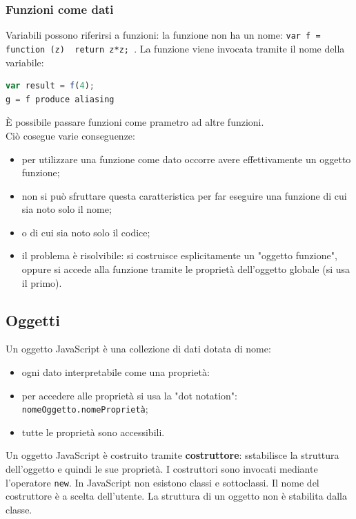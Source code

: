 \documentclass{article}
\begin{document}
\subsubsection{Funzioni come dati}
Variabili possono riferirsi a funzioni: la funzione non ha un nome: \texttt{var f = function (z) { return z*z; }}. La funzione viene invocata tramite il nome della variabile:
\begin{lstlisting}[language=JavaScript]
var result = f(4);
g = f produce aliasing
\end{lstlisting}
È possibile passare funzioni come prametro ad altre funzioni.
\\ Ciò cosegue varie conseguenze:
\begin{itemize}
    \item per utilizzare una funzione come dato occorre avere effettivamente un oggetto funzione;
    \item non si può sfruttare questa caratteristica per far eseguire una funzione di cui sia noto solo il nome;
    \item o di cui sia noto solo il codice;
    \item il problema è risolvibile: si costruisce esplicitamente un "oggetto funzione", oppure si accede alla funzione tramite le proprietà dell'oggetto globale (si usa il primo).
\end{itemize}
\subsection{Oggetti}
Un oggetto JavaScript è una collezione di dati dotata di nome:
\begin{itemize}
    \item ogni dato interpretabile come una proprietà:
    \item per accedere alle proprietà si usa la "dot notation": \texttt{nomeOggetto.nomeProprietà};
    \item tutte le proprietà sono accessibili.
\end{itemize}
Un oggetto JavaScript è costruito tramite \textbf{costruttore}: sstabilisce la struttura dell'oggetto e quindi le sue proprietà. I costruttori sono invocati mediante l'operatore \texttt{new}.
In JavaScript non esistono classi e sottoclassi. Il nome del costruttore è a scelta dell'utente. La struttura di un oggetto non è stabilita dalla classe.
\end{document}
